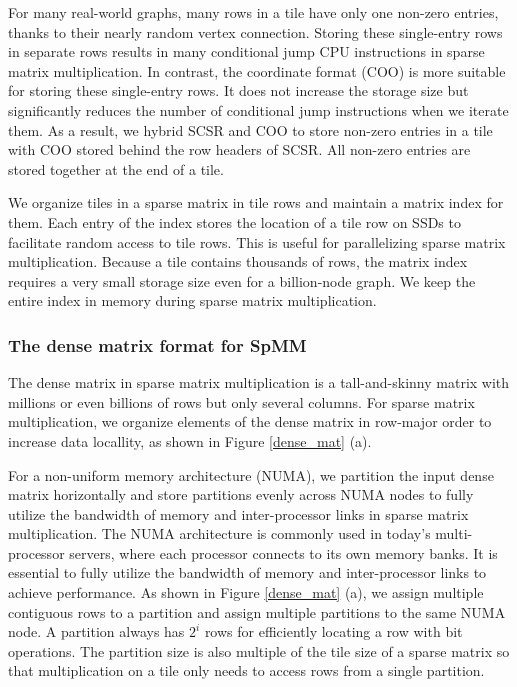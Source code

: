 For many real-world graphs, many rows in a tile have only one non-zero entries,
thanks to their nearly random vertex connection. Storing these single-entry
rows in separate rows results in many conditional jump CPU instructions in
sparse matrix multiplication.
In contrast, the coordinate format (COO) is more suitable for storing these
single-entry rows. It does not increase the storage size but significantly
reduces the number of conditional jump instructions when we iterate
them. As a result, we hybrid SCSR and COO to store non-zero entries in a tile
with COO stored behind the row headers of SCSR. All non-zero entries are
stored together at the end of a tile.

We organize tiles in a sparse matrix in tile rows and maintain a matrix index
for them. Each entry of the index stores the location of a tile row on SSDs
to facilitate random access
to tile rows. This is useful for parallelizing sparse matrix multiplication.
Because a tile contains thousands of rows, the matrix index requires a very
small storage size even for a billion-node graph. We keep the entire index
in memory during sparse matrix multiplication.

\subsubsection{The dense matrix format for SpMM} \label{numa_mat}
The dense matrix in sparse matrix multiplication is a tall-and-skinny matrix
with millions or even billions of rows but only several columns. For sparse
matrix multiplication, we organize elements of the dense matrix in row-major
order to increase data locallity, as shown in Figure \ref{dense_mat} (a).

For a non-uniform memory architecture (NUMA), we partition the input dense matrix
horizontally and store partitions evenly across NUMA nodes to fully utilize
the bandwidth of memory and inter-processor links in sparse matrix
multiplication. The NUMA architecture is commonly used in today's multi-processor
servers, where each processor connects to its own memory banks. It is essential
to fully utilize the bandwidth of memory and inter-processor links to achieve
performance. As shown in Figure \ref{dense_mat} (a), we assign multiple
contiguous rows to a partition and assign multiple partitions to the same
NUMA node. A partition always has $2^i$ rows for efficiently locating a row
with bit operations. The partition size is also multiple of the tile size of
a sparse matrix so that multiplication on a tile only needs to access rows
from a single partition.

